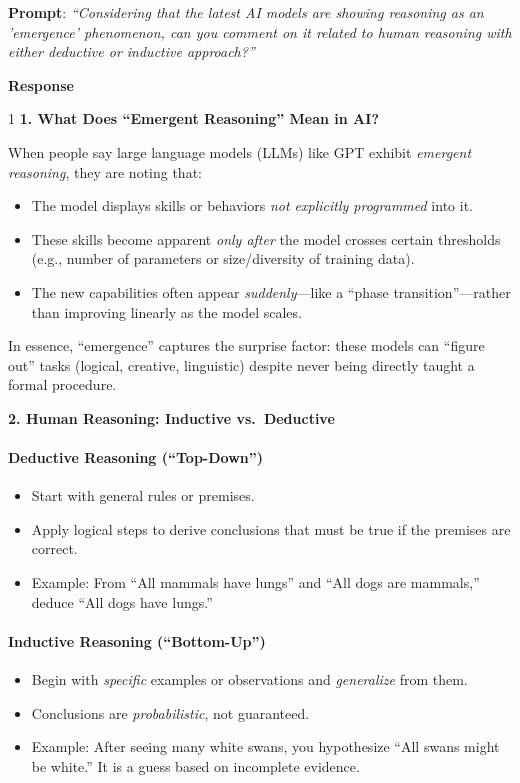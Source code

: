 {\sffamily

\noindent \textbf{Prompt}: \textit{``Considering that the latest AI models are showing reasoning as an 'emergence' phenomenon, can you comment on it related to human reasoning with either deductive or inductive approach?''}

\noindent \textbf{Response}

\begin{spacing}{1}
\noindent \textbf{1. What Does ``Emergent Reasoning'' Mean in AI?}

When people say large language models (LLMs) like GPT exhibit \emph{emergent reasoning}, they are noting that:
\begin{itemize}
    \item The model displays skills or behaviors \emph{not explicitly programmed} into it.
    \item These skills become apparent \emph{only after} the model crosses certain thresholds (e.g., number of parameters or size/diversity of training data).
    \item The new capabilities often appear \emph{suddenly}---like a ``phase transition''---rather than improving linearly as the model scales.
\end{itemize}

In essence, ``emergence'' captures the surprise factor: these models can ``figure out'' tasks (logical, creative, linguistic) despite never being directly taught a formal procedure.

\noindent\textbf{2. Human Reasoning: Inductive vs.\ Deductive}
\paragraph{Deductive Reasoning (``Top-Down'')} 
\begin{itemize}
    \item Start with general rules or premises.
    \item Apply logical steps to derive conclusions that must be true if the premises are correct.
    \item Example: From ``All mammals have lungs'' and ``All dogs are mammals,'' deduce ``All dogs have lungs.''
\end{itemize}

\paragraph{Inductive Reasoning (``Bottom-Up'')}
\begin{itemize}
    \item Begin with \emph{specific} examples or observations and \emph{generalize} from them.
    \item Conclusions are \emph{probabilistic}, not guaranteed.
    \item Example: After seeing many white swans, you hypothesize ``All swans might be white.'' It is a guess based on incomplete evidence.
\end{itemize}


\end{spacing}}
